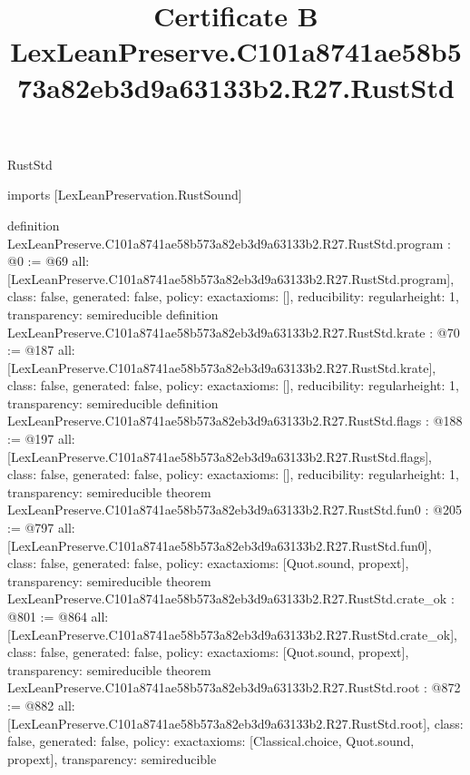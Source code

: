 \begin{lexlean}{RustStd}
\title{Certificate B LexLeanPreserve.C101a8741ae58b573a82eb3d9a63133b2.R27.RustStd}
\begin{coremodule}
imports [LexLeanPreservation.RustSound]

definition LexLeanPreserve.C101a8741ae58b573a82eb3d9a63133b2.R27.RustStd.program : @0 := @69 {
  all: [LexLeanPreserve.C101a8741ae58b573a82eb3d9a63133b2.R27.RustStd.program],
  class: false,
  generated: false,
  policy: exact{axioms: []},
  reducibility: regular{height: 1},
  transparency: semireducible
}
definition LexLeanPreserve.C101a8741ae58b573a82eb3d9a63133b2.R27.RustStd.krate : @70 := @187 {
  all: [LexLeanPreserve.C101a8741ae58b573a82eb3d9a63133b2.R27.RustStd.krate],
  class: false,
  generated: false,
  policy: exact{axioms: []},
  reducibility: regular{height: 1},
  transparency: semireducible
}
definition LexLeanPreserve.C101a8741ae58b573a82eb3d9a63133b2.R27.RustStd.flags : @188 := @197 {
  all: [LexLeanPreserve.C101a8741ae58b573a82eb3d9a63133b2.R27.RustStd.flags],
  class: false,
  generated: false,
  policy: exact{axioms: []},
  reducibility: regular{height: 1},
  transparency: semireducible
}
theorem LexLeanPreserve.C101a8741ae58b573a82eb3d9a63133b2.R27.RustStd.fun0 : @205 := @797 {
  all: [LexLeanPreserve.C101a8741ae58b573a82eb3d9a63133b2.R27.RustStd.fun0],
  class: false,
  generated: false,
  policy: exact{axioms: [Quot.sound, propext]},
  transparency: semireducible
}
theorem LexLeanPreserve.C101a8741ae58b573a82eb3d9a63133b2.R27.RustStd.crate_ok : @801 := @864 {
  all: [LexLeanPreserve.C101a8741ae58b573a82eb3d9a63133b2.R27.RustStd.crate_ok],
  class: false,
  generated: false,
  policy: exact{axioms: [Quot.sound, propext]},
  transparency: semireducible
}
theorem LexLeanPreserve.C101a8741ae58b573a82eb3d9a63133b2.R27.RustStd.root : @872 := @882 {
  all: [LexLeanPreserve.C101a8741ae58b573a82eb3d9a63133b2.R27.RustStd.root],
  class: false,
  generated: false,
  policy: exact{axioms: [Classical.choice, Quot.sound, propext]},
  transparency: semireducible
}


\end{coremodule}
\end{lexlean}
